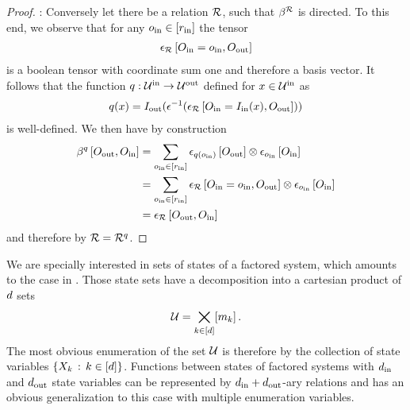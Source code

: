 \begin{proof}
    \proofleftsymbol:
    Conversely let there be a relation $\mathcal{R}$, such that $\beta^{\mathcal{R}}$ is directed.
    To this end, we observe that for any $o_{\mathrm{in}}\in[r_{\mathrm{in}}]$ the tensor
    \begin{align*}
        \epsilon_{\mathcal{R}}\left[O_{\mathrm{in}}=o_{\mathrm{in}},O_{\mathrm{out}}\right]
    \end{align*}
    is a boolean tensor with coordinate sum one and therefore a basis vector.
    It follows that the function $q : \mathcal{U}^{\mathrm{in}} \rightarrow \mathcal{U}^{\mathrm{out}} $ defined for $x\in\mathcal{U}^{\mathrm{in}}$ as
    \begin{align*}
        q(x)
        = I_{\mathrm{out}}(\epsilon^{-1}(\epsilon_{\mathcal{R}}\left[O_{\mathrm{in}}=I_{\mathrm{in}}(x),O_{\mathrm{out}}\right]))
    \end{align*}
    is well-defined.
    We then have by construction
    \begin{align*}
        \beta^{q}\left[O_{\mathrm{out}},O_{\mathrm{in}}\right]
        & = \sum_{o_{\mathrm{in}}\in[r_{\mathrm{in}}]}
        \epsilon_{q(o_{\mathrm{in}})}\left[O_{\mathrm{out}}\right] \otimes
        \epsilon_{o_{\mathrm{in}}}\left[O_{\mathrm{in}}\right] \\
        & =  \sum_{o_{\mathrm{in}}\in[r_{\mathrm{in}}]} \epsilon_{\mathcal{R}}\left[O_{\mathrm{in}}=o_{\mathrm{in}},O_{\mathrm{out}}\right] \otimes
        \epsilon_{o_{\mathrm{in}}}\left[O_{\mathrm{in}}\right] \\
        & = \epsilon_{\mathcal{R}}\left[O_{\mathrm{out}},O_{\mathrm{in}}\right]
    \end{align*}
    and therefore by  $\mathcal{R}=\mathcal{R}^{q}$.
\end{proof}

We are specially interested in sets of states of a factored system, which amounts to the case in .
Those state sets have a decomposition into a cartesian product of $d$ sets
\[ \mathcal{U} = \bigtimes_{k\in[d]}[m_{k}] \, . \]
The most obvious enumeration of the set $\mathcal{U}$ is therefore by the collection of state variables $\{X_{k}\, : \, k\in[d] \}$.
Functions between states of factored systems with $d_{\mathrm{in}}$ and $d_{\mathrm{out}}$ state variables can be represented by $d_{\mathrm{in}}+d_{\mathrm{out}}$-ary relations and  has an obvious generalization to this case with multiple enumeration variables.

